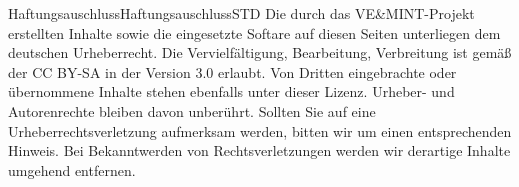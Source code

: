 \begin{MXContent}{Haftungsauschluss}{Haftungsauschluss}{STD}
Die durch das VE\&MINT-Projekt erstellten Inhalte sowie die eingesetzte Softare auf diesen Seiten unterliegen dem deutschen Urheberrecht.
Die Vervielfältigung, Bearbeitung, Verbreitung ist gemäß der  CC BY-SA in der Version 3.0 erlaubt.
Von Dritten eingebrachte oder übernommene Inhalte stehen ebenfalls unter dieser Lizenz. Urheber- und Autorenrechte bleiben davon unberührt.
Sollten Sie auf eine Urheberrechtsverletzung aufmerksam werden, bitten wir um einen entsprechenden Hinweis. Bei Bekanntwerden von Rechtsverletzungen werden wir derartige Inhalte umgehend entfernen. 
\end{MXContent}
